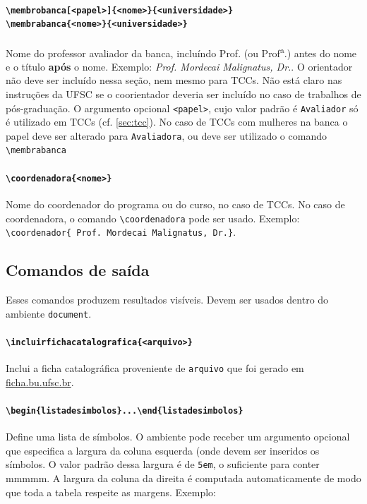 \documentclass[embeddedlogo]{ufsc-thesis-rn46-2019}
\newcommand{\lacmd}[1]{\texttt{\textbackslash{}#1}}
\newcommand{\laenv}[1]{\texttt{\textbackslash{}begin\{#1\}...\textbackslash{}end\{#1\}}}
\begin{document}
\paragraph*{\lacmd{membrobanca[<papel>]\{<nome>\}\{<universidade>\}} \\
            \lacmd{membrabanca\{<nome>\}\{<universidade>\}}}
Nome do professor avaliador da banca, incluíndo Prof. (ou
Prof\textsuperscript{a}.) antes do nome e o título \textbf{após} o
nome. Exemplo: \emph{Prof. Mordecai Malignatus, Dr.}. O orientador não deve ser
incluído nessa seção, nem mesmo para TCCs. Não está claro nas instruções da UFSC
se o coorientador deveria ser incluído no caso de trabalhos de pós-graduação. O
argumento opcional \texttt{<papel>}, cujo valor padrão é \texttt{Avaliador} só é
utilizado em TCCs (cf. \autoref{sec:tcc}). No caso de TCCs com mulheres na banca
o papel deve ser alterado para \texttt{Avaliadora}, ou deve ser utilizado o
comando \lacmd{membrabanca}

\paragraph*{\lacmd{coordenadora\{<nome>\}}} Nome do coordenador do programa ou
do curso, no caso de TCCs. No caso de coordenadora, o comando
\lacmd{coordenadora} pode ser usado. Exemplo: \lacmd{coordenador\{
  Prof. Mordecai Malignatus, Dr.\}}.

\subsection{Comandos de saída}

Esses comandos produzem resultados visíveis. Devem ser usados dentro do
ambiente \texttt{document}.

\paragraph*{\lacmd{incluirfichacatalografica\{<arquivo>\}}}
Inclui a ficha catalográfica proveniente de \texttt{arquivo} que foi gerado em
\href{http://ficha.bu.ufsc.br/}{ficha.bu.ufsc.br}.

\paragraph*{\laenv{listadesimbolos}}
Define uma lista de símbolos. O ambiente pode receber um argumento opcional que
especifica a largura da coluna esquerda (onde devem ser inseridos os símbolos. O
valor padrão dessa largura é de \texttt{5em}, o suficiente para conter mmmmm. A
largura da coluna da direita é computada automaticamente de modo que toda a
tabela respeite as margens. Exemplo:
\end{document}
